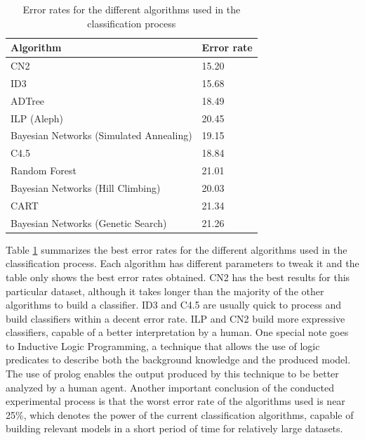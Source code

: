 \documentclass[a4paper]{llncs}
\begin{document}
\begin{table}
    \begin{center}
    \begin{tabular}{ | l | l | }
    \hline
    \textbf{Algorithm} & \textbf{Error rate} \\ \hline
    CN2 & 15.20 \\ \hline
    ID3 & 15.68 \\ \hline
    ADTree & 18.49 \\ \hline
    ILP (Aleph) & 20.45 \\ \hline
    Bayesian Networks (Simulated Annealing) & 19.15 \\ \hline
    C4.5 & 18.84 \\ \hline
    Random Forest & 21.01 \\ \hline
    Bayesian Networks (Hill Climbing) & 20.03 \\ \hline
    CART & 21.34 \\ \hline
    Bayesian Networks (Genetic Search) & 21.26 \\ \hline
    \end{tabular}
    \caption{Error rates for the different algorithms used in the classification process}
    \label{tbl:overall_results}
    \end{center}
\end{table}

Table \ref{tbl:overall_results} summarizes the best error rates for the 
different algorithms used in the classification process. Each algorithm has 
different parameters to tweak it and the table only shows the best error rates
obtained. CN2 has the best results for this particular dataset, although it
takes longer than the majority of the other algorithms to build a classifier. 
ID3 and C4.5 are usually quick to process and build classifiers within a decent
error rate. ILP and CN2 build more expressive classifiers, capable of a better
interpretation by a human. One special note goes to Inductive Logic Programming,
a technique that allows the use of logic predicates to describe both the 
background knowledge and the produced model. The use of prolog enables the 
output produced by this technique to be better analyzed by a human agent. 
Another important conclusion of the conducted experimental process is that the 
worst error rate of the algorithms used is near 25\%, which denotes the power
of the current classification algorithms, capable of building relevant models in
a short period of time for relatively large datasets.
\end{document}
